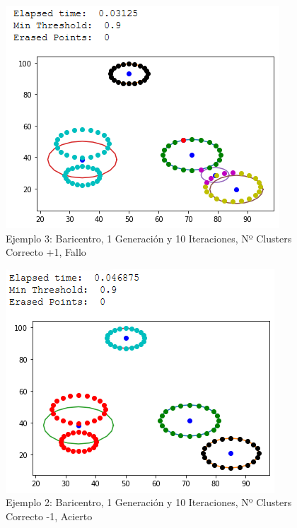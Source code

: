 \documentclass[conference,a4paper]{IEEEtran}
\begin{document}
\begin{figure}[H]
\centering
\includegraphics[scale=0.65]{Experimentacion/Ejemplo3/ej3_b_1_10_mc_wrong}
\caption{Ejemplo 3: Baricentro, 1 Generación y 10 Iteraciones,  Nº Clusters Correcto +1, Fallo\\}
\end{figure}

\begin{figure}[H]
\centering
\includegraphics[scale=0.65]{Experimentacion/Ejemplo3/ej3_b_1_10_lc_correct}
\caption{Ejemplo 2: Baricentro, 1 Generación y 10 Iteraciones,  Nº Clusters Correcto -1, Acierto\\}
\end{figure}
\end{document}
